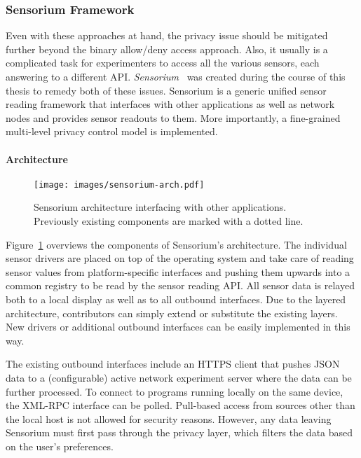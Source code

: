 \subsubsection{Sensorium Framework}

Even with these approaches at hand, the privacy issue should be mitigated further beyond the binary allow/deny access approach. Also, it usually is a complicated task for experimenters to access all the various sensors, each answering to a different \gls{API}. \textit{Sensorium}~\cite{raf2013sensorium} 
was created during the course of this thesis to remedy both of these issues. Sensorium is a generic unified sensor reading framework that interfaces with other applications as well as network nodes and provides sensor readouts to them. More importantly, a fine-grained multi-level privacy control model is implemented.


\paragraph{Architecture}

\begin{figure}[htb]
	\centering
	\texttt{[image: images/sensorium-arch.pdf]}
	\caption{Sensorium architecture interfacing with other applications. Previously existing components are marked with a dotted line.}
\label{c5:fig:architecture}
\end{figure}

Figure~\ref{c5:fig:architecture} overviews the components of Sensorium's architecture. The individual sensor drivers are placed on top of the operating system and take care of reading sensor values from platform-specific interfaces and pushing them upwards into a common registry to be read by the sensor reading \acrshort{API}. All sensor data is relayed both to a local display as well as to all outbound interfaces. Due to the layered architecture, contributors can simply extend or substitute the existing layers. New drivers or additional outbound interfaces can be easily implemented in this way. 

The existing outbound interfaces include an \gls{HTTPS} client that pushes \acrshort{JSON} data to a (configurable) active network experiment server where the data can be further processed. To connect to programs running locally on the same device, the \acrshort{XML}-\acrshort{RPC} interface can be polled. Pull-based access from sources other than the local host is not allowed for security reasons. However, any data leaving Sensorium must first pass through the privacy layer, which filters the data based on the user's preferences.


